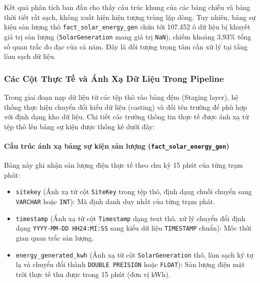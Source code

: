 \documentclass[12pt,a4paper]{article}
\begin{document}
Kết quả phân tích ban đầu cho thấy cấu trúc khung của các bảng chiều và bảng thời tiết rất sạch, không xuất hiện hiện tượng trùng lặp dòng. Tuy nhiên, bảng sự kiện sản lượng thô \texttt{fact\_solar\_energy\_gen} chứa tới 107.452 ô dữ liệu bị khuyết giá trị sản lượng (\texttt{Solar\allowbreak Generation} mang giá trị \texttt{NaN}), chiếm khoảng 3,93\% tổng số quan trắc đo đạc của cả năm. Đây là đối tượng trọng tâm cần xử lý tại tầng làm sạch dữ liệu.

\subsubsection{Các Cột Thực Tế và Ánh Xạ Dữ Liệu Trong Pipeline}
Trong giai đoạn nạp dữ liệu từ các tệp thô vào bảng đệm (Staging layer), hệ thống thực hiện chuyển đổi kiểu dữ liệu (casting) và đổi tên trường để phù hợp với định dạng kho dữ liệu. Chi tiết các trường thông tin thực tế được ánh xạ từ tệp thô lên bảng sự kiện được thống kê dưới đây:

\paragraph{Cấu trúc ánh xạ bảng sự kiện sản lượng (\texttt{fact\_solar\_energy\_gen})}
Bảng này ghi nhận sản lượng điện thực tế theo chu kỳ 15 phút của từng trạm phát:
\begin{itemize}
    \item \texttt{sitekey} (Ánh xạ từ cột \texttt{SiteKey} trong tệp thô, định dạng chuỗi chuyển sang \texttt{VARCHAR} hoặc \texttt{INT}): Mã định danh duy nhất của từng trạm phát.
    \item \texttt{timestamp} (Ánh xạ từ cột \texttt{Timestamp} dạng text thô, xử lý chuyển đổi định dạng \texttt{YYYY-MM-DD HH24:MI:SS} sang kiểu dữ liệu \texttt{TIMESTAMP} chuẩn): Mốc thời gian quan trắc sản lượng.
    \item \texttt{energy\_generated\_kwh} (Ánh xạ từ cột \texttt{Solar\allowbreak Generation} thô, làm sạch ký tự lạ và chuyển đổi thành \texttt{DOUBLE PREISION} hoặc \texttt{FLOAT}): Sản lượng điện mặt trời thực tế thu được trong 15 phút (đơn vị kWh).
\end{itemize}
\end{document}
